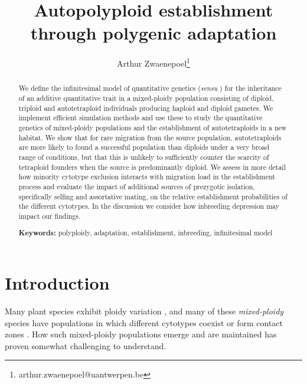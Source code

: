 \documentclass[12pt,a4paper]{article}
\begin{document}
\title{Autopolyploid establishment through polygenic adaptation}
\author[1]{Arthur Zwaenepoel\thanks{arthur.zwaenepoel@uantwerpen.be}}
\date{\vspace{-5ex}}
\maketitle
\begin{abstract}
We define the infinitesimal model of quantitative genetics (\textit{sensu}
    \cite{barton2017}) for the inheritance of an additive quantitative trait in
    a mixed-ploidy population consisting of diploid, triploid and
    autotetraploid individuals producing haploid and diploid gametes.  We
    implement efficient simulation methods and use these to study the
    quantitative genetics of mixed-ploidy populations and the establishment of
    autotetraploids in a new habitat.  We show that for rare migration from the
    source population, autotetraploids are more likely to found a successful
    population than diploids under a very broad range of conditions, but that
    this is unlikely to sufficiently counter the scarcity of tetraploid
    founders when the source is predominantly diploid.  We assess in more
    detail how minority cytotype exclusion interacts with migration load in the
    establishment process and evaluate the impact of additional sources of
    prezygotic isolation, specifically selfing and assortative mating, on the
    relative establishment probabilities of the different cytotypes.
    In the discussion we consider how inbreeding depression may impact our
    findings.

    \textbf{Keywords:} polyploidy, adaptation, establishment, inbreeding,
    infinitesimal model
\end{abstract}

\section*{Introduction}


Many plant species exhibit ploidy variation
\citep{levin2002,soltis2007,rice2015}, and many of these \textit{mixed-ploidy}
species have populations in which different cytotypes coexist or form contact
zones \citep{kolar2017}.
How such mixed-ploidy populations emerge and are maintained has proven somewhat
challenging to understand.
\end{document}
